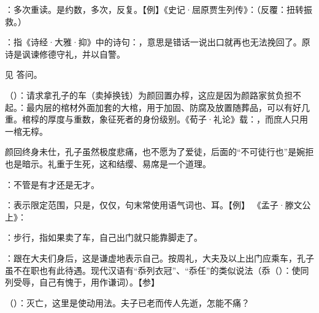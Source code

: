 {
\item {}：多次重读。是约数，多次，反复。【例】《史记·屈原贾生列传》：（反覆：扭转振救。）%
\item {}：指《诗经·大雅·抑》中的诗句：，意思是错话一说出口就再也无法挽回了。原诗是讽谏修德守礼，并以自警。
}
{}


{见  答问。}
{}


{
\item {}（）：请求拿孔子的车（卖掉换钱）为颜回置办椁，这应是因为颜路家贫负担不起。：最内层的棺材外面加套的大棺，用于加固、防腐及放置随葬品，可以有好几重。棺椁的厚度与重数，象征死者的身份级别。《荀子·礼论》载：，而庶人只用一棺无椁。

颜回终身未仕，孔子虽然极度悲痛，也不愿为了爱徒，后面的“不可徒行也”是婉拒也是暗示。礼重于生死，这和结缨、易席是一个道理。
\item {}：不管是有才还是无才。
\item {}：表示限定范围，只是，仅仅，句末常使用语气词也、耳。【例】 《孟子·滕文公上》：
\item {}：步行，指如果卖了车，自己出门就只能靠脚走了。
\item {}：跟在大夫们身后，这是谦虚地表示自己。按周礼，大夫及以上出门应乘车，孔子虽不在职也有此待遇。现代汉语有“忝列衣冠”、“忝任”的类似说法（忝（）：使同列受辱，自己有愧于，用作谦词）。【参】
}
{}


{
\item {}（）：灭亡，这里是使动用法。夫子已老而传人先逝，怎能不痛？ %
}
{}


